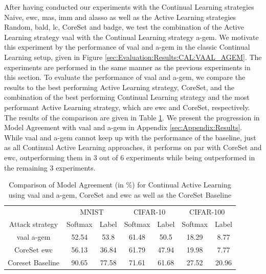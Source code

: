 After having conducted our experiments with the Continual Learning strategies Naive, \gls{ewc}, \gls{mas}, \gls{imm} and \gls{alasso} as well as the Active Learning strategies
Random, \gls{bald}, \gls{lc}, CoreSet and \gls{badge}, we test the combination of the Active Learning strategy \gls{vaal} with the Continual Learning strategy \gls{a-gem}. We motivate
this experiment by the performance of \gls{vaal} and \gls{a-gem} in the classic Continual Learning setup, given in Figure \ref{sec:Evaluation:Results:CAL:VAAL_AGEM}.
The experiments are performed in the same manner as the previous experiments in this section. To evaluate the performance of \gls{vaal} and \gls{a-gem}, we compare
the results to the best performing Active Learning strategy, CoreSet, and the combination of the best performing Continual Learning strategy and the
most performant Active Learning strategy, which are \gls{ewc} and CoreSet, respectively. The results of the comparison are given in Table 
\ref{fig:ModelStealingVAALAGEM}. We present the progression in Model Agreement with \gls{vaal} and \gls{a-gem} in Appendix \ref{sec:Appendix:Results}. While \gls{vaal}
and \gls{a-gem} cannot keep up with the performance of the baseline, just as all Continual Active Learning approaches, it performs on par with CoreSet and \gls{ewc},
outperforming them in 3 out of 6 experiments while being outperformed in the remaining 3 experiments. \par
\begin{table}[h]
    \centering
    \begin{tabular}{c c c c c c c} 
        \hline
        & \multicolumn{2}{c}{MNIST} & \multicolumn{2}{c}{CIFAR-10} & \multicolumn{2}{c}{CIFAR-100} \\ 
        \cline{2-7} Attack strategy & Softmax & Label & Softmax & Label & Softmax & Label \\
        \hline 
        \gls{vaal} \gls{a-gem} & 52.54 & 53.8 & 61.48 & 50.5 & 18.29 & 8.77\\
        CoreSet \gls{ewc} & 56.13 & 36.84 & 61.79 & 47.94 & 19.98 & 7.77 \\
        Coreset Baseline & 90.65 & 77.58 & 71.61 & 61.68 & 27.52 & 20.96\\
        \hline
    \end{tabular}
    \caption[Comparison of Model Agreement using \gls{vaal} and \gls{a-gem}]{Comparison of Model Agreement (in \%) for Continual Active Learning using \gls{vaal}
     and \gls{a-gem}, CoreSet and \gls{ewc} as well as the CoreSet Baseline}
    \label{fig:ModelStealingVAALAGEM}
\end{table}

